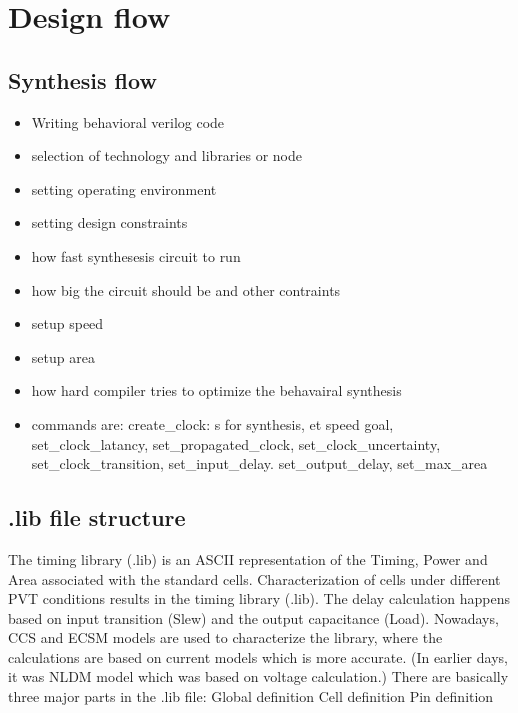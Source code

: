 \documentclass[a4paper]{article}
\begin{document}
\section{Design flow}
\label{sec:org54a85ac}

\subsection{Synthesis flow}
\label{sec:org58246ef}
\begin{itemize}
\item Writing behavioral verilog code
\item selection of technology and libraries or node
\item setting operating environment
\item setting design constraints
\item how fast synthesesis circuit to run
\item how big the circuit should be and other contraints
\item setup speed
\item setup area
\item how hard compiler tries to optimize the behavairal synthesis
\item commands are: create\_clock: s for synthesis, et speed goal, set\_clock\_latancy, set\_propagated\_clock, set\_clock\_uncertainty, set\_clock\_transition, set\_input\_delay. set\_output\_delay, set\_max\_area
\end{itemize}


\subsection{.lib file structure}
\label{sec:org3f4fed2}

The timing library (.lib) is an ASCII representation of the Timing, Power and Area associated with the
standard cells.
Characterization of cells under different PVT conditions results in the timing library (.lib).
The delay calculation happens based on input transition (Slew) and the output capacitance (Load).
Nowadays, CCS and ECSM models are used to characterize the library, where the calculations are based
on current models which is more accurate. (In earlier days, it was NLDM model which was based on voltage
calculation.)
There are basically three major parts in the .lib file:
Global definition
Cell definition
Pin definition
\end{document}

